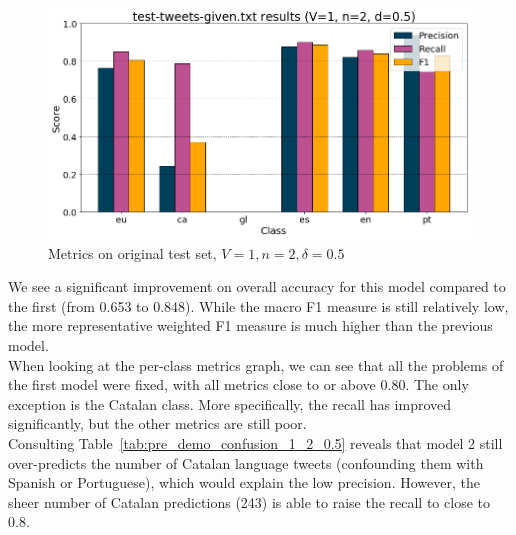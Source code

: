\documentclass[runningheads]{llncs}
\begin{document}
\begin{figure}
    \begin{center}
        \includegraphics[width=12.5cm]{images/test_tweets_given_results_1_2_0.5.png}
        \caption{Metrics on original test set, $V=1, n=2, \delta=0.5$}
        \label{fig:pre_demo_1_2_0.5}
    \end{center}
\end{figure}

We see a significant improvement on overall accuracy for this model compared to the first (from 0.653 to 0.848). While the macro F1 measure is still relatively low, the more representative weighted F1 measure is much higher than the previous model. \\

When looking at the per-class metrics graph, we can see that all the problems of the first model were fixed, with all metrics close to or above 0.80. The only exception is the Catalan class. More specifically, the recall has improved significantly, but the other metrics are still poor. \\

Consulting Table~\ref{tab:pre_demo_confusion_1_2_0.5} reveals that model 2 still over-predicts the number of Catalan language tweets (confounding them with Spanish or Portuguese), which would explain the low precision. However, the sheer number of Catalan predictions (243) is able to raise the recall to close to 0.8. \\
\end{document}
